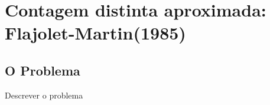 \chapter{Contagem distinta aproximada: Flajolet-Martin(1985)}
\label{lab:flajolet:martin}

\section{O Problema}

Descrever o problema